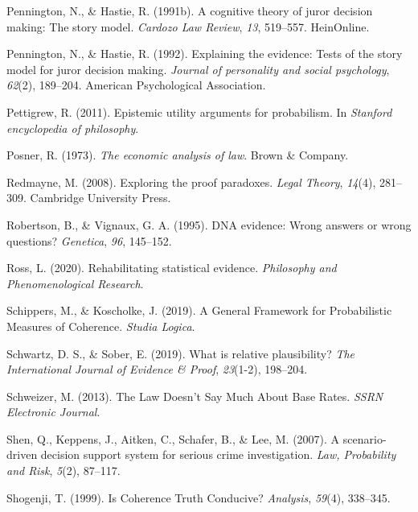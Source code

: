 \documentclass[11pt,dvipsnames,enabledeprecatedfontcommands]{scrartcl}
\begin{document}
\leavevmode\hypertarget{ref-pennington1991cognitive}{}%
Pennington, N., \& Hastie, R. (1991b). A cognitive theory of juror
decision making: The story model. \emph{Cardozo Law Review}, \emph{13},
519--557. HeinOnline.

\leavevmode\hypertarget{ref-pennington1992explaining}{}%
Pennington, N., \& Hastie, R. (1992). Explaining the evidence: Tests of
the story model for juror decision making. \emph{Journal of personality
and social psychology}, \emph{62}(2), 189--204. American Psychological
Association.

\leavevmode\hypertarget{ref-Pettigrew2011Epistemic-Utili}{}%
Pettigrew, R. (2011). Epistemic utility arguments for probabilism. In
\emph{Stanford encyclopedia of philosophy}.

\leavevmode\hypertarget{ref-Posner1973}{}%
Posner, R. (1973). \emph{The economic analysis of law}. Brown \&
Company.

\leavevmode\hypertarget{ref-redmayne2008exploring}{}%
Redmayne, M. (2008). Exploring the proof paradoxes. \emph{Legal Theory},
\emph{14}(4), 281--309. Cambridge University Press.

\leavevmode\hypertarget{ref-Robertson1995evidence}{}%
Robertson, B., \& Vignaux, G. A. (1995). DNA evidence: Wrong answers or
wrong questions? \emph{Genetica}, \emph{96}, 145--152.

\leavevmode\hypertarget{ref-ross2020}{}%
Ross, L. (2020). Rehabilitating statistical evidence. \emph{Philosophy
and Phenomenological Research}.

\leavevmode\hypertarget{ref-Schippers2019General}{}%
Schippers, M., \& Koscholke, J. (2019). A General Framework for
Probabilistic Measures of Coherence. \emph{Studia Logica}.

\leavevmode\hypertarget{ref-schwartz2019WhatRelativePlausibility}{}%
Schwartz, D. S., \& Sober, E. (2019). What is relative plausibility?
\emph{The International Journal of Evidence \& Proof}, \emph{23}(1-2),
198--204.

\leavevmode\hypertarget{ref-schweizer2013LawDoesnSay}{}%
Schweizer, M. (2013). The Law Doesn't Say Much About Base Rates.
\emph{SSRN Electronic Journal}.

\leavevmode\hypertarget{ref-shen2007ScenariodrivenDecisionSupporta}{}%
Shen, Q., Keppens, J., Aitken, C., Schafer, B., \& Lee, M. (2007). A
scenario-driven decision support system for serious crime investigation.
\emph{Law, Probability and Risk}, \emph{5}(2), 87--117.

\leavevmode\hypertarget{ref-shogenji1999}{}%
Shogenji, T. (1999). Is Coherence Truth Conducive? \emph{Analysis},
\emph{59}(4), 338--345.
\end{document}
